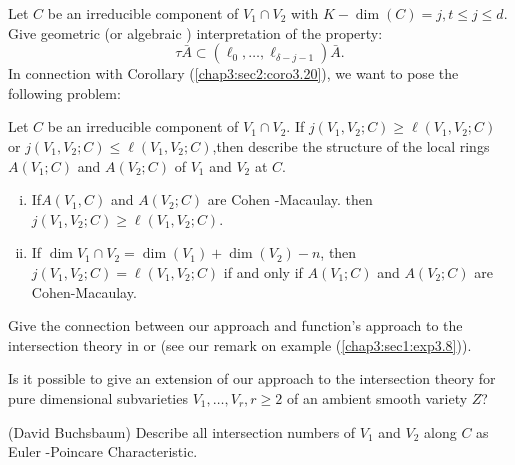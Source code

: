 \setcounter{numproblem}{37}
\begin{numproblem}[4]\label{chap3:sec3:prob3.38}%
  Let  $C$ be an irreducible component of $V_1 \cap V_2$ with $K-\dim
  (C)=j,t \leq j \leq d$. Give geometric (or algebraic ) interpretation
  of the property: 
  $$  
  \tau \bar{A} \subset( \ell _0, \ldots,  \ell _{\delta- j- 1}) \bar{A}.
  $$
  In connection with Corollary (\ref{chap3:sec2:coro3.20}), we want to
  pose the following problem: 
\end{numproblem}

\begin{numproblem}[5]\label{chap3:sec3:prob3.39}%
  Let $C$ be an irreducible component of $V_1 \cap V_2$. If $
  j(V_1,V_2 ;C) \geq \ell (V_1,V_2;C)$ or $j(V_1, V_2;C)\leq \ell
  (V_1, V_2;C)$,then describe the structure of the local rings
  $A(V_1;C) $ and $A(V_2;C) $ of $V_1$ and $V_2$ at $C$. 
\end{numproblem}

\setcounter{remarks}{39}
\begin{remarks}\label{chap3:sec3:rem40}
  \begin{enumerate}[(i)]
  \item If\pageoriginale $A(V_1,C)$ and  $A(V_2;C)$ are Cohen -Macaulay. then $j(V_1,
    V_2;C) \geq \ell (V_1, V_2;C)$. 
  \item If $\dim V_1 \cap V_2 = \dim (V_1) +\dim (V_2) -n $, then
    $j(V_1, V_2;C) = \ell (V_1, V_2;C)$ if and only if $A(V_1;C)$ and
    $A(V_2;C)$ are Cohen-Macau\-lay. 
  \end{enumerate}
\end{remarks}

\setcounter{numproblem}{40}
\begin{numproblem}[6]\label{chap3:sec3:prob3.41} %
 Give the connection between our approach and function's approach to
 the intersection theory in \cite{18} or \cite{19} (see our remark on
 example (\ref{chap3:sec1:exp3.8})). 
\end{numproblem}

\begin{numproblem}[7]\label{chap3:sec3:prob3.42} %
  Is it possible to give an extension of our approach to the
  intersection theory  for pure dimensional subvarieties $V_1,\ldots,
  V_r, r \geq 2$ of an ambient smooth variety $Z$?  
\end{numproblem}

\begin{numproblem}[8](David Buchsbaum)\label{chap3:sec3:prob3.43} %
Describe all intersection numbers of $V_1$ and $V_2$ along $C$ as
Euler -Poincare Characteristic. 
\end{numproblem}

